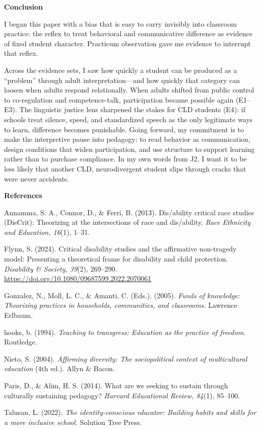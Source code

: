 \documentclass[12pt]{article}
\newcommand{\apaheading}[1]{\begin{center}\textbf{#1}\end{center}}
\newcommand{\reference}[1]{\noindent\hangindent=0.5in\hangafter=1 #1\par}
\newcommand{\EvidenceSet}[1]{\textsc{E#1}}
\newcommand{\JournalArtifact}[1]{\textsc{J#1}}
\begin{document}
\apaheading{Conclusion}

I began this paper with a bias that is easy to carry invisibly into classroom practice: the reflex to treat behavioral and communicative difference as evidence of fixed student character. Practicum observation gave me evidence to interrupt that reflex.

Across the evidence sets, I saw how quickly a student can be produced as a ``problem'' through adult interpretation---and how quickly that category can loosen when adults respond relationally. When adults shifted from public control to co-regulation and competence-talk, participation became possible again (\EvidenceSet{1}--\EvidenceSet{3}). The linguistic justice lens sharpened the stakes for CLD students (\EvidenceSet{4}): if schools treat silence, speed, and standardized speech as the only legitimate ways to learn, difference becomes punishable. Going forward, my commitment is to make the interpretive pause into pedagogy: to read behavior as communication, design conditions that widen participation, and use structure to support learning rather than to purchase compliance. In my own words from \JournalArtifact{2}, I want it to be less likely that another CLD, neurodivergent student slips through cracks that were never accidents.

\newpage
\apaheading{References}

\reference{Annamma, S. A., Connor, D., \& Ferri, B. (2013). Dis/ability critical race studies (DisCrit): Theorizing at the intersections of race and dis/ability. \textit{Race Ethnicity and Education, 16}(1), 1--31.}

\reference{Flynn, S. (2024). Critical disability studies and the affirmative non-tragedy model: Presenting a theoretical frame for disability and child protection. \textit{Disability \& Society, 39}(2), 269--290. \url{https://doi.org/10.1080/09687599.2022.2070061}}

\reference{Gonzalez, N., Moll, L. C., \& Amanti, C. (Eds.). (2005). \textit{Funds of knowledge: Theorizing practices in households, communities, and classrooms.} Lawrence Erlbaum.}

\reference{hooks, b. (1994). \textit{Teaching to transgress: Education as the practice of freedom.} Routledge.}

\reference{Nieto, S. (2004). \textit{Affirming diversity: The sociopolitical context of multicultural education} (4th ed.). Allyn \& Bacon.}

\reference{Paris, D., \& Alim, H. S. (2014). What are we seeking to sustain through culturally sustaining pedagogy? \textit{Harvard Educational Review, 84}(1), 85--100.}

\reference{Talusan, L. (2022). \textit{The identity-conscious educator: Building habits and skills for a more inclusive school.} Solution Tree Press.}
\end{document}

